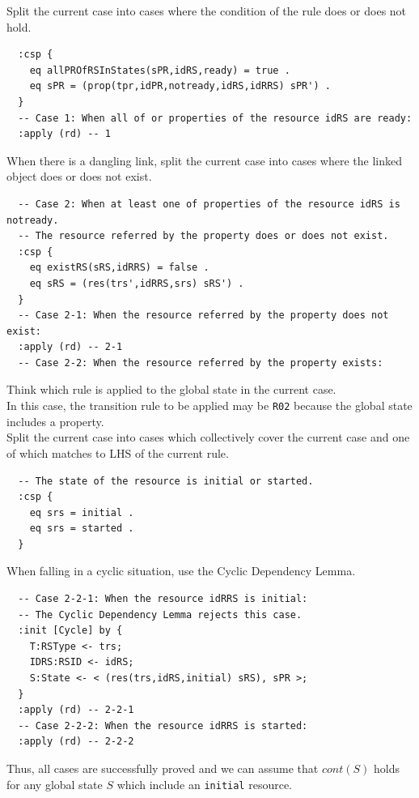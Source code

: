 \documentclass[12pt]{report}
\begin{document}
 Split the current case into cases where
the condition of the rule does or does not hold.
\small
\begin{verbatim}
  :csp { 
    eq allPROfRSInStates(sPR,idRS,ready) = true .
    eq sPR = (prop(tpr,idPR,notready,idRS,idRRS) sPR') .
  }
  -- Case 1: When all of or properties of the resource idRS are ready:
  :apply (rd) -- 1
\end{verbatim}
\normalsize
 When there is a dangling link, split the
current case into cases where the linked object does or does not
exist.
\small
\begin{verbatim}
  -- Case 2: When at least one of properties of the resource idRS is notready.
  -- The resource referred by the property does or does not exist.
  :csp {
    eq existRS(sRS,idRRS) = false .
    eq sRS = (res(trs',idRRS,srs) sRS') .
  }
  -- Case 2-1: When the resource referred by the property does not exist:
  :apply (rd) -- 2-1
  -- Case 2-2: When the resource referred by the property exists:
\end{verbatim}
\normalsize
 Think which rule is applied to the 
global state in the current case. \\
In this case, the transition rule to be applied may be {\tt R02} because the
global state includes a property.\\

 Split the current case into cases which
collectively cover the current case and one of which matches to LHS of
the current rule. 
\small
\begin{verbatim}
  -- The state of the resource is initial or started.
  :csp { 
    eq srs = initial .
    eq srs = started .
  }
\end{verbatim}
\normalsize
 When falling in a cyclic situation, use the
Cyclic Dependency Lemma. 
\small
\begin{verbatim}
  -- Case 2-2-1: When the resource idRRS is initial:
  -- The Cyclic Dependency Lemma rejects this case.
  :init [Cycle] by {
    T:RSType <- trs;
    IDRS:RSID <- idRS;
    S:State <- < (res(trs,idRS,initial) sRS), sPR >;
  }
  :apply (rd) -- 2-2-1
  -- Case 2-2-2: When the resource idRRS is started:
  :apply (rd) -- 2-2-2
\end{verbatim}
\normalsize
Thus, all cases are successfully proved and we can assume that $cont(S)$
holds for any global state $S$ which include an {\tt initial}
resource.
\end{document}
